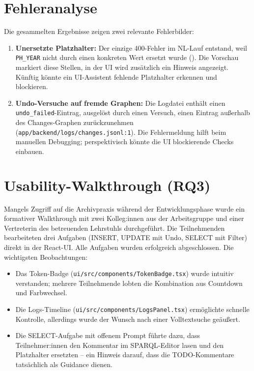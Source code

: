 \section{Fehleranalyse}

Die gesammelten Ergebnisse zeigen zwei relevante Fehlerbilder:
\begin{enumerate}
  \item \textbf{Unersetzte Platzhalter:} Der einzige 400-Fehler im NL-Lauf entstand, weil \texttt{PH\_YEAR} nicht durch einen konkreten Wert ersetzt wurde (). Die Vorschau markiert diese Stellen, in der UI wird zusätzlich ein Hinweis angezeigt. Künftig könnte ein UI-Assistent fehlende Platzhalter erkennen und blockieren.
  \item \textbf{Undo-Versuche auf fremde Graphen:} Die Logdatei enthält einen \texttt{undo\_failed}-Eintrag, ausgelöst durch einen Versuch, einen Eintrag außerhalb des Changes-Graphen zurückzunehmen (\texttt{app/backend/logs/changes.jsonl:1}). Die Fehlermeldung hilft beim manuellen Debugging; perspektivisch könnte die UI blockierende Checks einbauen.
\end{enumerate}

\section{Usability-Walkthrough (RQ3)}

Mangels Zugriff auf die Archivpraxis während der Entwicklungsphase wurde ein formativer Walkthrough mit zwei Kolleg:innen aus der Arbeitsgruppe und einer Vertreterin des betreuenden Lehrstuhls durchgeführt. Die Teilnehmenden bearbeiteten drei Aufgaben (INSERT, UPDATE mit Undo, SELECT mit Filter) direkt in der React-UI. Alle Aufgaben wurden erfolgreich abgeschlossen. Die wichtigsten Beobachtungen:

\begin{itemize}
  \item Das Token-Badge (\texttt{ui/src/components/TokenBadge.tsx}) wurde intuitiv verstanden; mehrere Teilnehmende lobten die Kombination aus Countdown und Farbwechsel.
  \item Die Logs-Timeline (\texttt{ui/src/components/LogsPanel.tsx}) ermöglichte schnelle Kontrolle, allerdings wurde der Wunsch nach einer Volltextsuche geäußert.
  \item Die SELECT-Aufgabe mit offenem Prompt führte dazu, dass Teilnehmer:innen den Kommentar im SPARQL-Editor lasen und den Platzhalter ersetzten – ein Hinweis darauf, dass die TODO-Kommentare tatsächlich als Guidance dienen.
\end{itemize}

